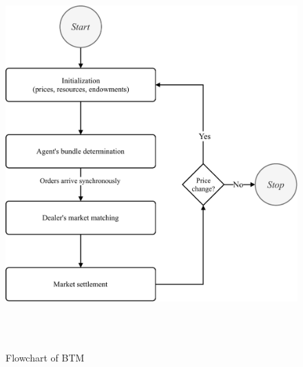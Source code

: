\begin{figure}[htbp]
        \centering
        \includegraphics[width=0.59\linewidth]{./figures/btm_flowchart.pdf}
        \caption{Flowchart of BTM \protect{}}
        \label{figure:btm_flowchart}
\end{figure}


\clearpage